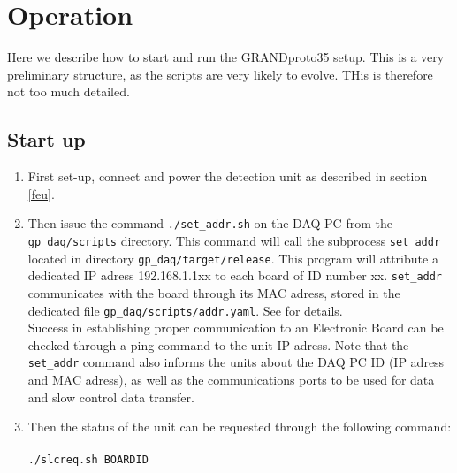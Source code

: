 \section{Operation} 
\label{operation}
Here we describe how to start and run the GRANDproto35 setup. This is a very preliminary structure, as the scripts are very likely to evolve. THis is therefore not too much detailed.

\subsection{Start up}
\label{startup}
\begin{enumerate}[1-]
\item{ First set-up, connect and power the detection unit as described in section \ref{feu}. \\} 
%
\item{Then issue the command \texttt{./set\_addr.sh} on the DAQ PC from the \texttt{gp\_daq/scripts} directory. This command will call the subprocess \texttt{set\_addr} located in directory \texttt{gp\_daq/target/release}. This program will attribute a dedicated IP adress 192.168.1.1xx to each board of ID number xx. \texttt{set\_addr} communicates with the board through its MAC adress, stored in the dedicated file \texttt{gp\_daq/scripts/addr.yaml}. See \cite{daq_git} for details. \\
Success in establishing proper communication to an Electronic Board can be checked through a ping command to the unit IP adress. Note that the \texttt{set\_addr} command also informs the units about the DAQ PC ID (IP adress and MAC adress), as well as the communications ports to be used for data and slow control data transfer. \\ }
%
\item{Then the status of the unit can be requested through the following command: \\
\ \\
\texttt{./slcreq.sh  BOARDID }\\
\ \\
}
\end{enumerate}
